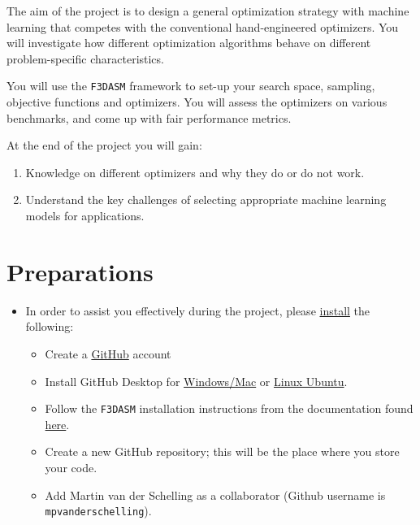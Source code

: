 \documentclass[10pt,a4paper,twoside]{article} %
\def\code#1{\texttt{#1}}
\begin{document}

The aim of the project is to design a general optimization strategy with machine learning that competes with the conventional hand-engineered optimizers. You will investigate how different optimization algorithms behave on different problem-specific characteristics. 

You will use the \code{F3DASM} framework to set-up your search space, sampling, objective functions and optimizers. You will assess the optimizers on various benchmarks, and come up with fair performance metrics.

At the end of the project you will gain:
\begin{enumerate}
	\item Knowledge on different optimizers and why they do or do not work.
	\item Understand the key challenges of selecting appropriate machine learning models for applications.

\end{enumerate}

\section*{Preparations}

\vspace{5mm}
 

\begin{itemize}
\setcounter{enumi}{1}
	\item In order to assist you effectively during the project, please \underline{install} the following:
	
	\begin{itemize}
		
		\item Create a \href{https://github.com/}{GitHub} account
		
		\item Install GitHub Desktop for \href{https://desktop.github.com/}{Windows/Mac} or \href{https://linuxhint.com/install-and-use-github-desktop-on-ubuntu/}{Linux Ubuntu}.
		
		\item Follow the \code{F3DASM} installation instructions from the documentation found \href{https://bessagroup.github.io/F3DASM/gettingstarted.html}{here}.
		
		\item Create a new GitHub repository; this will be the place where you store your code.
		
		\item Add Martin van der Schelling as a collaborator (Github username is \code{mpvanderschelling}).
		
	\end{itemize}
	
\end{itemize}
\end{document}
